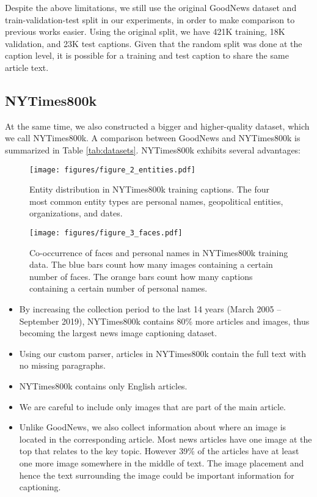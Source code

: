 \documentclass[10pt,twocolumn,letterpaper]{article}
\begin{document}
Despite the above limitations, we still use the original GoodNews dataset and
train-validation-test split in our experiments, in order to make comparison to
previous works easier. Using the original split, we have 421K training, 18K
validation, and 23K test captions. Given that the random split was done at the
caption level, it is possible for a training and test caption to share the same
article text.


\subsection{NYTimes800k}

At the same time, we also constructed a bigger and higher-quality dataset,
which we call NYTimes800k. A comparison between GoodNews and NYTimes800k is
summarized in Table \ref{tab:datasets}. NYTimes800k exhibits several
advantages:

\begin{figure}[t]
   \begin{center}
   \texttt{[image: figures/figure\_2\_entities.pdf]}
   \end{center}
      \caption{Entity distribution in NYTimes800k training captions. The four
               most common entity types are personal names, geopolitical
               entities, organizations, and dates.}
   \label{fig:entities}
\end{figure}

\begin{figure}[t]
   \begin{center}
   \texttt{[image: figures/figure\_3\_faces.pdf]}
   \end{center}
      \caption{Co-occurrence of faces and personal names in NYTimes800k
               training data. The blue bars count how many images containing a
               certain number of faces. The orange bars count how many captions
               containing a certain number of personal names.}
   \label{fig:faces}
\end{figure}


\begin{itemize}
   \item By increasing the collection period to the last 14 years (March 2005
   -- September 2019), NYTimes800k contains 80\% more articles and images, thus
   becoming the largest news image captioning dataset.
   \item Using our custom parser, articles in NYTimes800k contain the full text
   with no missing paragraphs.
   \item NYTimes800k contains only English articles.
   \item We are careful to include only images that are part of the main
   article.
   \item Unlike GoodNews, we also collect information about where an image is
   located in the corresponding article. Most news articles have one image at
   the top that relates to the key topic. However 39\% of the articles have at
   least one more image somewhere in the middle of text. The image placement
   and hence the text surrounding the image could be important information for
   captioning.
\end{itemize}
\end{document}
